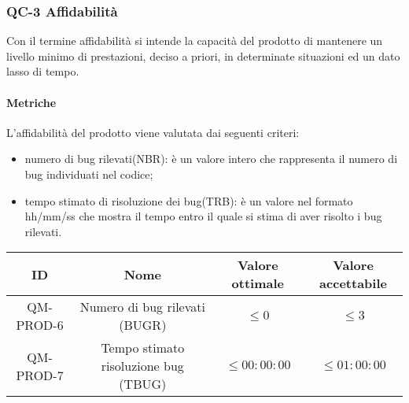 \subsubsection{QC-3 Affidabilità}
Con il termine affidabilità si intende la capacità del prodotto di mantenere un livello minimo di prestazioni, deciso a priori, in determinate situazioni ed un dato lasso di tempo.

	\paragraph{Metriche}
	L'affidabilità del prodotto viene valutata dai seguenti criteri:
	\begin{itemize}
		\item numero di bug rilevati(NBR): è un valore intero che rappresenta il numero di bug individuati nel codice;
		\item tempo stimato di risoluzione dei bug(TRB): è un valore nel formato hh/mm/ss che mostra il tempo entro il quale si stima di aver risolto i bug rilevati.
	\end{itemize}
	\begin{center}
		\begin{tabular}{|c|c|c|c|}
			\rowcolor{lighter-grayer}
			\hline
			ID & Nome & Valore ottimale & Valore accettabile \\
			\hline
			QM-PROD-6 & Numero di bug rilevati (BUGR) & \(\le 0\) &\(\le 3\) \\
			\hline
			QM-PROD-7 & Tempo stimato risoluzione bug (TBUG) & \(\le 00:00:00\) & \(\le 01:00:00\) \\
			\hline
		\end{tabular}
	\end{center}
